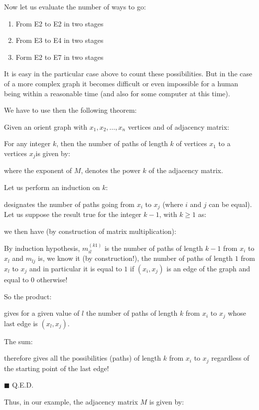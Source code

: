 {	Now let us evaluate the number of ways to go:
	\begin{enumerate}
		\item From E2 to E2 in two stages
		\item From E3 to E4 in two stages
		\item Form E2 to E7 in two stages
	\end{enumerate}
	It is easy in the particular case above to count these possibilities. But in the case of a more complex graph it becomes difficult or even impossible for a human being within a reasonable time (and also for some computer at this time).
	
	We have to use then the following theorem:
	\begin{theorem}
	Given an orient graph with $x_1,x_2,\ldots, x_n$ vertices and of adjacency matrix:
	
	For any integer $k$, then the number of paths of length $k$ of vertices $x_1$ to a vertices $x_j$is given by:
	
	where the exponent of $M$, denotes the power $k$ of the adjacency matrix.
	\end{theorem}
	\begin{dem}
	Let us perform an induction on $k$:
	
	designates the number of paths going from $x_i$ to $x_j$ (where $i$ and $j$ can be equal). Let us suppose the result true for the integer $k-1$, with $k\geq 1$ as:
	
	we then have (by construction of matrix multiplication):
	
	By induction hypothesis, $m_{il}^{(k­1)}$ is the number of paths of length $k-1$ from $x_i$ to $x_l$ and $m_{lj}$ is, we know it (by construction!), the number of paths of length $1$ from $x_l$ to $x_j$ and in particular it is equal to $1$ if $(x_i,x_j)$ is an edge of the graph and equal to $0$ otherwise!
	
	So the product:
	
	gives for a given value of $l$ the number of paths of length $k$ from $x_i$ to $x_j$ whose last edge is $(x_l,x_j)$.

	The sum:
	
	therefore gives all the possibilities (paths) of length $k$ from $x_i$ to $x_j$ regardless of the starting point of the last edge!
	\begin{flushright}
		$\blacksquare$  Q.E.D.
	\end{flushright}
	\end{dem}
	Thus, in our example, the adjacency matrix $M$ is given by:
	
}
